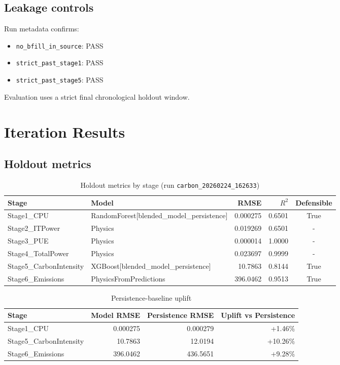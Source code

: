 \documentclass[11pt]{article}
\begin{document}
\subsection{Leakage controls}
Run metadata confirms:
\begin{itemize}[leftmargin=1.2em]
  \item \texttt{no\_bfill\_in\_source}: PASS
  \item \texttt{strict\_past\_stage1}: PASS
  \item \texttt{strict\_past\_stage5}: PASS
\end{itemize}
Evaluation uses a strict final chronological holdout window.

\section{Iteration Results}
\subsection{Holdout metrics}
\begin{table}[H]
\centering
\caption{Holdout metrics by stage (run \texttt{carbon\_20260224\_162633})}
\begin{tabular}{llrrc}
\toprule
Stage & Model & RMSE & $R^2$ & Defensible \\
\midrule
Stage1\_CPU & RandomForest[blended\_model\_persistence] & 0.000275 & 0.6501 & True \\
Stage2\_ITPower & Physics & 0.019269 & 0.6501 & - \\
Stage3\_PUE & Physics & 0.000014 & 1.0000 & - \\
Stage4\_TotalPower & Physics & 0.023697 & 0.9999 & - \\
Stage5\_CarbonIntensity & XGBoost[blended\_model\_persistence] & 10.7863 & 0.8144 & True \\
Stage6\_Emissions & PhysicsFromPredictions & 396.0462 & 0.9513 & True \\
\bottomrule
\end{tabular}
\end{table}

\begin{table}[H]
\centering
\caption{Persistence-baseline uplift}
\begin{tabular}{lrrr}
\toprule
Stage & Model RMSE & Persistence RMSE & Uplift vs Persistence \\
\midrule
Stage1\_CPU & 0.000275 & 0.000279 & +1.46\% \\
Stage5\_CarbonIntensity & 10.7863 & 12.0194 & +10.26\% \\
Stage6\_Emissions & 396.0462 & 436.5651 & +9.28\% \\
\bottomrule
\end{tabular}
\end{table}
\end{document}
